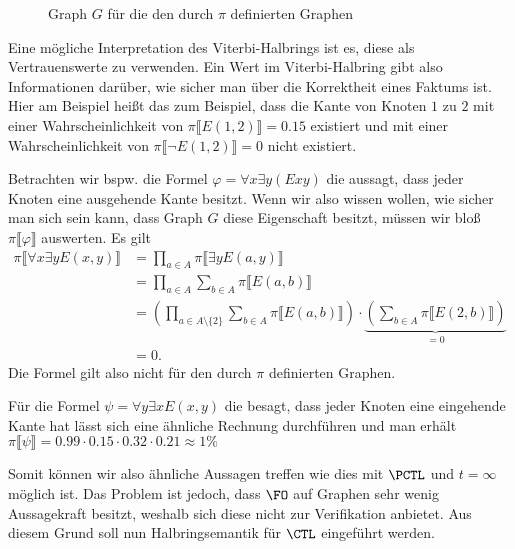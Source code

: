 \begin{example}
\begin{figure}[h]
\begin{center}
			
			\caption{Graph $G$ für die den durch $\pi$ definierten Graphen}
			\label{SemiringSemanticsFOBspGraph}
		\end{center}
	\end{figure}
	
	Eine mögliche Interpretation des Viterbi-Halbrings ist es, diese als Vertrauenswerte zu verwenden. 
	Ein Wert im Viterbi-Halbring gibt also Informationen darüber, wie sicher man über die Korrektheit eines Faktums ist. 
	Hier am Beispiel heißt das zum Beispiel, dass die Kante von Knoten $1$ zu $2$ mit einer Wahrscheinlichkeit von $\pi\llbracket E(1,2)\rrbracket = 0.15$ existiert und mit einer Wahrscheinlichkeit von $\pi\llbracket \neg E(1,2)\rrbracket = 0$ nicht existiert.
	
	Betrachten wir bspw. die Formel $\varphi=\forall x \exists y (Exy)$ die aussagt, dass jeder Knoten eine ausgehende Kante besitzt. 
	Wenn wir also wissen wollen, wie sicher man sich sein kann, dass Graph $G$ diese Eigenschaft besitzt, müssen wir bloß $\pi\llbracket \varphi \rrbracket$ auswerten. Es gilt
	\begin{align*}
		\pi\llbracket \forall x \exists y E(x,y)\rrbracket &= \prod_{a\in A}\pi\llbracket \exists y E(a,y)\rrbracket \\
		&= \prod_{a\in A}\sum_{b\in A} \pi\llbracket E(a,b)\rrbracket \\
		&= \left(\prod_{a\in A\setminus\{2\}}\sum_{b\in A} \pi\llbracket E(a,b)\rrbracket\right) \cdot \underbrace{\left(\sum_{b\in A} \pi\llbracket E(2,b)\rrbracket\right)}_{=0} \\
		&= 0.
	\end{align*}
	Die Formel gilt also nicht für den durch $\pi$ definierten Graphen.
	
	Für die Formel $\psi= \forall y \exists x E(x,y)$ die besagt, dass jeder Knoten eine eingehende Kante hat lässt sich eine ähnliche Rechnung durchführen und man erhält $\pi\llbracket \psi \rrbracket = 0.99\cdot 0.15\cdot 0.32 \cdot 0.21 \approx 1\%$
\end{example}

Somit können wir also ähnliche Aussagen treffen wie dies mit $\PCTL$ und $t=\infty$ möglich ist.
Das Problem ist jedoch, dass $\FO$ auf Graphen sehr wenig Aussagekraft besitzt, weshalb sich diese nicht zur Verifikation anbietet.
Aus diesem Grund soll nun Halbringsemantik für $\CTL$ eingeführt werden.

